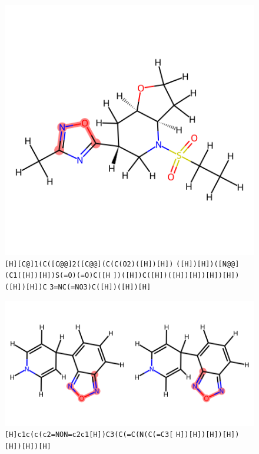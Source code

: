 \documentclass{article}
\begin{document}
\begin{figure}[ht]
\centering
    \includegraphics{mol10.png}
\cprotect\caption{\verb|[H][C@]1(C([C@@]2([C@@](C(C(O2)([H])[H])| \verb|([H])[H])([N@@](C1([H])[H])S(=O)(=O)C([H| \verb|])([H])C([H])([H])[H])[H])[H])([H])[H])C| \verb|3=NC(=NO3)C([H])([H])[H]| }
\end{figure}

\begin{figure}[ht]
\centering
    \includegraphics{mol11.png}
\cprotect\caption{\verb|[H]c1c(c(c2=NON=c2c1[H])C3(C(=C(N(C(=C3[| \verb|H])[H])[H])[H])[H])[H])[H]| }
\end{figure}
\end{document}

